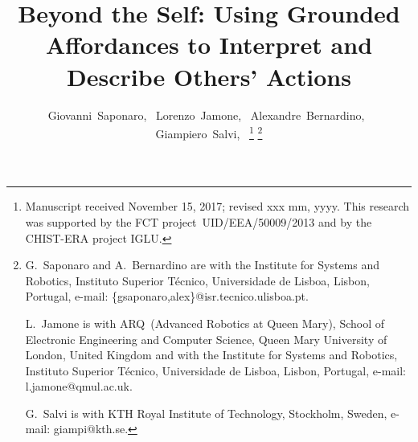\documentclass[journal]{IEEEtran}
\newcommand{\hr}{human--robot}
\begin{document}
\title{Beyond the Self: Using Grounded Affordances to Interpret and Describe Others' Actions}

\author{Giovanni~Saponaro,~
        Lorenzo~Jamone,~
        Alexandre~Bernardino,~
        Giampiero~Salvi,~
        \thanks{
          Manuscript received November 15, 2017; revised xxx mm, yyyy. This research was supported by the FCT project~UID/EEA/50009/2013 and by the CHIST-ERA project IGLU.}
\thanks{G.~Saponaro and A.~Bernardino are with the
Institute for Systems and Robotics, Instituto Superior Técnico,
Universidade de Lisboa, Lisbon, Portugal, e-mail: \{gsaponaro,alex\}@isr.tecnico.ulisboa.pt.

L.~Jamone is with ARQ~(Advanced Robotics at Queen Mary), School of Electronic Engineering and Computer Science, Queen Mary University of London, United Kingdom
and with the
Institute for Systems and Robotics, Instituto Superior Técnico, Universidade de Lisboa, Lisbon, Portugal,
e-mail: l.jamone@qmul.ac.uk.

G.~Salvi is with KTH Royal Institute of Technology, Stockholm, Sweden,
e-mail: giampi@kth.se.
}}

\maketitle
\IEEEpeerreviewmaketitle

\begin{abstract}
  
\end{abstract}
\end{document}
